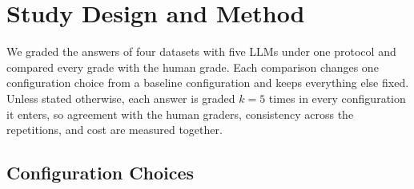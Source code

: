 
\section{Study Design and Method}
\label{sec:method}

We graded the answers of four datasets with five LLMs under one protocol and compared every grade with the
human grade. Each comparison changes one
configuration choice from a baseline configuration and keeps everything else fixed. Unless stated otherwise, each answer
is graded $k=5$ times in every configuration it enters, so agreement with the human graders, consistency across
the repetitions, and cost are measured together.

\subsection{Configuration Choices}
\label{sec:design}




